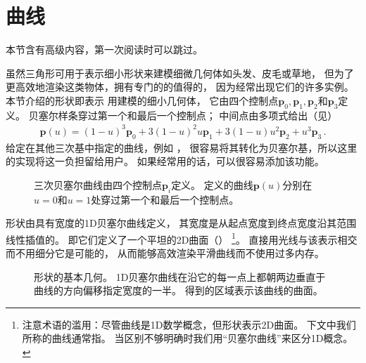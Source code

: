 \section{曲线}\label{sec:曲线}
\begin{remark}
    本节含有高级内容，第一次阅读时可以跳过。
\end{remark}

虽然三角形可用于表示细小形状来建模细微几何体如头发、皮毛或草地，
但为了更高效地渲染这类物体，拥有专门的的值得的，
因为经常出现它们的许多实例。
本节介绍的形状即表示
用建模的细小几何体，
它由四个控制点$\bm p_0,\bm p_1,\bm p_2$和$\bm p_3$定义。
贝塞尔样条穿过第一个和最后一个控制点；
中间点由多项式给出（见）
\begin{align}\label{eq:3.3}
    \bm p(u)=(1-u)^3\bm p_0+3(1-u)^2u\bm p_1+3(1-u)u^2\bm p_2+u^3\bm p_3\, .
\end{align}
给定在其他三次基中指定的曲线，例如
，
很容易将其转化为贝塞尔基，所以这里的实现将这一负担留给用户。
如果经常用的话，可以很容易添加该功能。
\begin{figure}[htbp]
    \centering
    \caption{三次贝塞尔曲线由四个控制点$\bm p_i$定义。
        \protect{}定义的曲线$\bm p(u)$分别在$u=0$和$u=1$处穿过第一个和最后一个控制点。}
    \label{fig:3.15}
\end{figure}

形状由具有宽度的1D贝塞尔曲线定义，
其宽度是从起点宽度到终点宽度沿其范围线性插值的。
即它们定义了一个平坦的2D曲面（）
\footnote{注意术语的滥用：尽管曲线是1D数学概念，但\protect{}形状表示2D曲面。
    下文中我们所称的曲线通常指\protect{}。
    当区别不够明确时我们用“贝塞尔曲线”来区分1D概念。}。
直接用光线与该表示相交而不用细分它是可能的，
从而能够高效渲染平滑曲线而不使用过多内存。
\begin{figure}[htbp]
    \centering
    \caption{\protect{}形状的基本几何。
        1D贝塞尔曲线在沿它的每一点上都朝两边垂直于曲线的方向偏移指定宽度的一半。
        得到的区域表示该曲线的曲面。}
    \label{fig:3.16}
\end{figure}

